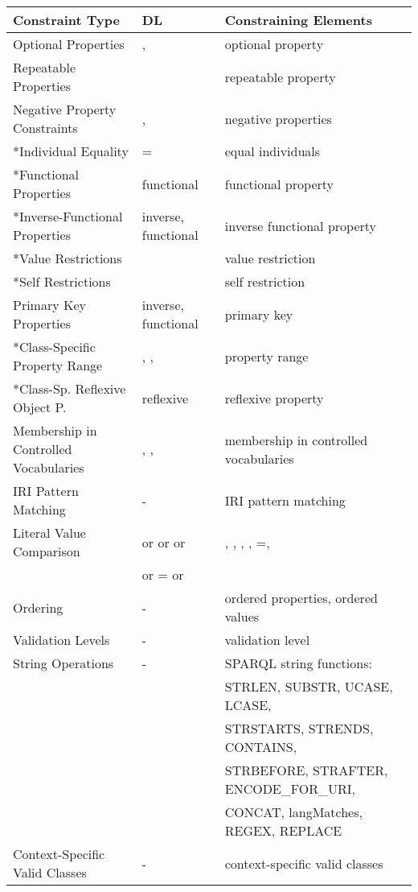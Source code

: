 \documentclass{llncs}
\begin{document}
\begin{table}[H]
    \begin{center}
    \begin{tabular}{lll}
           \multicolumn{1}{l}{\textbf{Constraint Type}} & \multicolumn{1}{l}{\textbf{DL}} & \multicolumn{1}{l}{\textbf{Constraining Elements}}			 
    \\ \midrule
		
Optional Properties & ,  & optional property \\
Repeatable Properties &  & repeatable property \\
Negative Property Constraints & ,  & negative properties \\
*Individual Equality & = & equal individuals \\
*Functional Properties & functional & functional property \\ 
*Inverse-Functional Properties & inverse, functional & inverse functional property \\
*Value Restrictions &  & value restriction \\
*Self Restrictions &  & self restriction \\
Primary Key Properties & inverse, functional & primary key \\
*Class-Specific Property Range & , ,  & property range \\
*Class-Sp. Reflexive Object P. & reflexive & reflexive property \\
Membership in Controlled Vocabularies & , ,  & membership in controlled vocabularies \\
IRI Pattern Matching & - & IRI pattern matching \\
Literal Value Comparison &  or  or  or & , , , , =,  \\
                         &  or = or  & \\
Ordering & - & ordered properties, ordered values \\ 
Validation Levels & - & validation level \\ 
String Operations & - & SPARQL string functions: \\ 
                     && STRLEN, SUBSTR, UCASE, LCASE, \\
										 && STRSTARTS, STRENDS, CONTAINS, \\ 
										 && STRBEFORE, STRAFTER, ENCODE\_FOR\_URI, \\
										 && CONCAT, langMatches, REGEX, REPLACE \\
Context-Specific Valid Classes & - & context-specific valid classes \\

\end{tabular}
\end{center}
\end{table}
\end{document}
